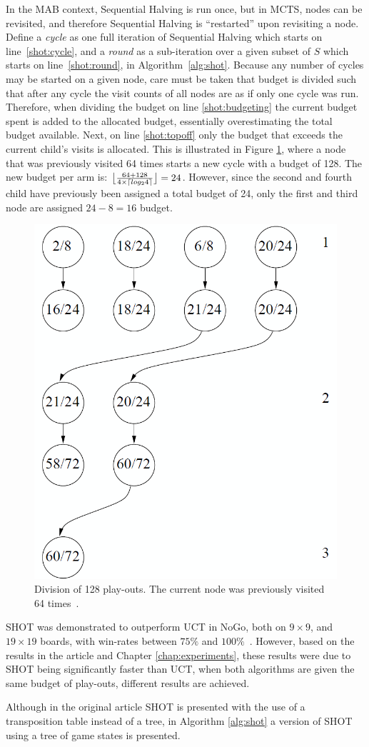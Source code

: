 \documentclass{icga}
\DeclarePairedDelimiter{\ceil}{\lceil}{\rceil}
\DeclarePairedDelimiter{\floor}{\lfloor}{\rfloor}
\begin{document}
In the MAB context, Sequential Halving is run once, but in MCTS, nodes can be revisited, and therefore Sequential Halving is ``restarted'' upon revisiting a node. Define a \emph{cycle} as one full iteration of Sequential Halving which starts on line~\ref{shot:cycle}, and a \emph{round} as a sub-iteration over a given subset of $S$ which starts on line~\ref{shot:round}, in Algorithm~\ref{alg:shot}. Because any number of cycles may be started on a given node, care must be taken that budget is divided such that after any cycle the visit counts of all nodes are as if only one cycle was run. Therefore, when dividing the budget on line \ref{shot:budgeting} the current budget spent is added to the allocated budget, essentially overestimating the total budget available. Next, on line \ref{shot:topoff} only the budget that exceeds the current child's visits is allocated. This is illustrated in Figure \ref{fig:shot-topoffs}, where a node that was previously visited 64 times starts a new cycle with a budget of 128. The new budget per arm is: $\floor[\big]{\frac{64 + 128}{4\times\ceil{log_2{4}}}} = 24$. However, since the second and fourth child have previously been assigned a total budget of 24, only the first and third node are assigned $24-8=16$ budget.

\begin{figure}[ht]
	\centering
	\includegraphics[width=.3\textwidth]{img/shot_topoffs.png}
	\caption{Division of 128 play-outs. The current node was previously visited 64 times~\cite{Cazenave14SHOT}.}
	\label{fig:shot-topoffs}
\end{figure}

SHOT was demonstrated to outperform UCT in NoGo, both on $9\times9$, and $19\times19$ boards, with win-rates between $75\%$ and $100\%$~\cite{Cazenave14SHOT}. However, based on the results in the article and Chapter \ref{chap:experiments}, these results were due to SHOT being significantly faster than UCT, when both algorithms are given the same budget of play-outs, different results are achieved.

Although in the original article SHOT is presented with the use of a transposition table instead of a tree, in Algorithm \ref{alg:shot} a version of SHOT using a tree of game states is presented.
\end{document}
